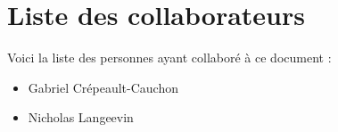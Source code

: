 \chapter{Liste des collaborateurs}
Voici la liste des personnes ayant collaboré à ce document : 
\begin{itemize}
\item Gabriel Crépeault-Cauchon
\item Nicholas Langeevin
\end{itemize}